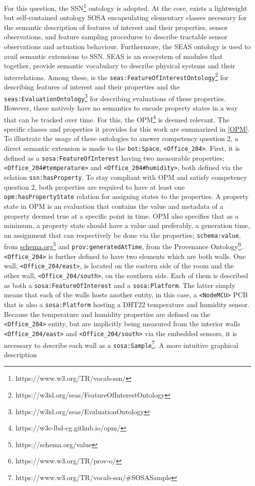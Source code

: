\begin{enumerate}
For this question, the \acf{SSN}\footnote{https://www.w3.org/TR/vocab-ssn/} \citep{Haller2017} ontology is adopted. At the core, exists a lightweight but self-contained ontology \ac{SOSA} encapsulating elementary classes necessary for the semantic description of features of interest and their properties, sensor observations, and feature sampling procedures to describe tractable sensor observations and actuation behaviour. Furthermore, the \ac{SEAS} \citep{Lefrancois2016} ontology is used to avail semantic extensions to \ac{SSN}. \ac{SEAS} is an ecosystem of modules that together, provide semantic vocabulary to describe physical systems and their interrelations. Among these, is the \texttt{seas:FeatureOfInterestOntology}\footnote{https://w3id.org/seas/FeatureOfInterestOntology} for describing features of interest and their properties and the \texttt{seas:EvaluationOntology}\footnote{https://w3id.org/seas/EvaluationOntology} for describing evaluations of these properties. However, these natively have no semantics to encode property states in a way that can be tracked over time. For this, the \ac{OPM}\footnote{https://w3c-lbd-cg.github.io/opm/} \citep{Rasmussen2018a} is deemed relevant. The specific classes and properties it provides for this work are summarized in \autoref{OPM}. To illustrate the usage of these ontologies to answer competency question 2, a direct semantic extension is made to the \texttt{bot:Space}, \texttt{<Office\_204>}. First, it is defined as a \texttt{sosa:FeatureOfInterest} having two measurable properties; \texttt{<Office\_204\#temperature>} and \texttt{<Office\_204\#humidity>}, both defined via the relation \texttt{ssn:hasProperty}. To stay compliant with OPM and satisfy competency question 2, both properties are required to have at least one \texttt{opm:hasPropertyState} relation for assigning states to the properties. A property state in \ac{OPM} is an evaluation that contains the value and metadata of a property deemed true at a specific point in time. \ac{OPM} also specifies that as a minimum, a property state should have a value and preferably, a generation time, an assignment that can respectively be done via the properties; \texttt{schema:value}, from \url{schema.org}\footnote{https://schema.org/value} and \texttt{prov:generatedAtTime}, from the Provenance Ontology\footnote{https://www.w3.org/TR/prov-o/}. \texttt{<Office\_204>} is further defined to have two elements which are both walls. One wall, \texttt{<Office\_204/east>}, is located on the eastern side of the room and the other wall, \texttt{<Office\_204/south>}, on the southern side. Each of them is described as both a \texttt{sosa:FeatureOfInterest} and a \texttt{sosa:Platform}. The latter simply means that each of the walls hosts another entity, in this case, a \texttt{<NodeMCU>} \ac{PCB} that is also a \texttt{sosa:Platform} hosting a DHT22 temperature and humidity sensor. Because the temperature and humidity properties are defined on the \texttt{<Office\_204>} entity, but are implicitly being measured from the interior walls \texttt{<Office\_204/east>} and \texttt{<Office\_204/south>} via the embedded sensors, it is necessary to describe each wall as a \texttt{sosa:Sample}\footnote{https://www.w3.org/TR/vocab-ssn/\#SOSASample}. A more intuitive graphical description 
\end{enumerate}
